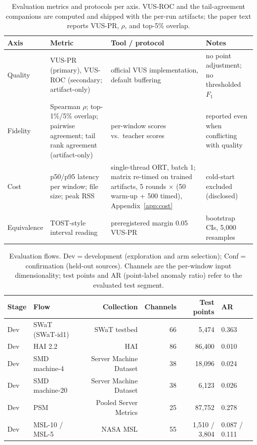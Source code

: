 \begin{table}[t]
\centering
\caption{Evaluation metrics and protocols per axis. VUS-ROC and the
tail-agreement companions are computed and shipped with the per-run
artifacts; the paper text reports VUS-PR, $\rho$, and top-5\% overlap.}
\label{tab:metrics}
\scriptsize
\begin{tabular}{p{1.7cm}p{3.1cm}p{2.3cm}p{2.6cm}}
\toprule
Axis & Metric & Tool / protocol & Notes \\
\midrule
Quality & VUS-PR (primary), VUS-ROC (secondary; artifact-only) & official VUS implementation, default buffering & no point adjustment; no thresholded $F_1$ \\
Fidelity & Spearman $\rho$; top-1\%/5\% overlap; pairwise agreement; tail rank agreement (artifact-only) & per-window scores vs.\ teacher scores & reported even when conflicting with quality \\
Cost & p50/p95 latency per window; file size; peak RSS & single-thread ORT, batch 1; matrix re-timed on trained artifacts, 5 rounds $\times$ (50 warm-up + 500 timed), Appendix~\ref{app:cost} & cold-start excluded (disclosed) \\
Equivalence & TOST-style interval reading & preregistered margin 0.05 VUS-PR & bootstrap CIs, 5{,}000 resamples \\
\bottomrule
\end{tabular}
\end{table}\begin{table}[t]
\centering
\caption{Evaluation flows. Dev$=$development (exploration and arm
selection); Conf$=$confirmation (held-out sources). Channels are the
per-window input dimensionality; test points and AR (point-label anomaly
ratio) refer to the evaluated test segment.}
\label{tab:flows}
\setlength{\tabcolsep}{3pt}
\scriptsize
\setlength{\tabcolsep}{2.2pt}
\begin{tabular}{p{1.3cm}p{2.55cm}rrrp{0.9cm}}
\toprule
Stage & Flow & Collection & Channels & Test points & AR \\
\midrule
Dev & SWaT (SWaT-id1) & SWaT testbed & 66 & 5{,}474 & 0.363 \\
Dev & HAI 2.2 & HAI & 86 & 86{,}400 & 0.010 \\
Dev & SMD machine-4 & Server Machine Dataset & 38 & 18{,}096 & 0.024 \\
Dev & SMD machine-20 & Server Machine Dataset & 38 & 6{,}123 & 0.026 \\
Dev & PSM & Pooled Server Metrics & 25 & 87{,}752 & 0.278 \\
Dev & MSL-10 / MSL-5 & NASA MSL & 55 & 1{,}510 / 3{,}804 & 0.087 / 0.111 \\

\end{tabular}
\end{table}
